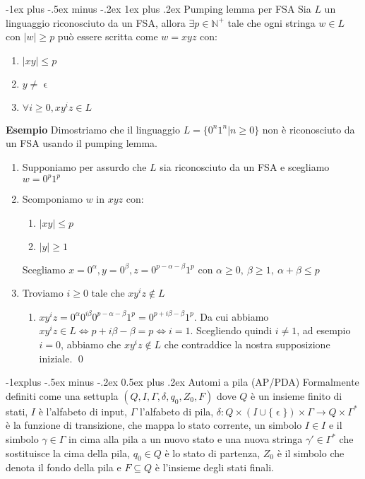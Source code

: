 \documentclass[10pt,landscape]{article}
\makeatletter
\renewcommand{\subsection}{\@startsection{subsection}{2}{0mm}%
                                {-1explus -.5ex minus -.2ex}%
                                {0.5ex plus .2ex}%
                                {\normalfont\large\bfseries}}
\renewcommand{\subsubsection}{\@startsection{subsubsection}{3}{0mm}%
                                {-1ex plus -.5ex minus -.2ex}%
                                {1ex plus .2ex}%
                                {\normalfont\normalsize\bfseries}}
\makeatother
\begin{document}
\begin{multicols*}{4}
        \subsubsection{Pumping lemma per FSA}
        Sia $L$ un linguaggio riconosciuto da un FSA, allora $\exists p \in \mathbb{N}^+$ tale che ogni stringa $w \in L$ con $|w| \geq p$ può essere scritta come $w = xyz$ con:
        \begin{enumerate}[left=3pt, itemsep=-1pt]
                \item $|xy| \leq p$
                \item $y \neq \upvarepsilon$
                \item $\forall i \geq 0, xy^iz \in L$
        \end{enumerate}
        \textbf{Esempio} Dimostriamo che il linguaggio $L = \{0^n1^n | n \geq 0\}$ non è riconosciuto da un FSA usando il pumping lemma.
        \begin{enumerate}[left=3pt, itemsep=0pt]
                \item Supponiamo per assurdo che $L$ sia riconosciuto da un FSA e scegliamo $w = 0^p1^p$
                \item Scomponiamo $w$ in $xyz$ con:
                      \begin{enumerate}[left=0pt, topsep=0pt, label=\tiny\textbullet]
                              \item $|xy| \leq p$
                              \item $|y| \geq 1$
                      \end{enumerate}
                      Scegliamo $x=0^\alpha, y=0^\beta, z=0^{p-\alpha-\beta}1^p$ con $\alpha \geq 0,\ \beta \geq 1,\ \alpha + \beta \leq p$
                \item Troviamo $i \geq 0$ tale che $xy^iz \notin L$
                      \begin{enumerate}[left=-3pt, topsep=0pt, label=]
                              \item $xy^iz = 0^\alpha0^{i\beta}0^{p-\alpha-\beta}1^p = 0^{p+i\beta-\beta}1^p$. Da cui abbiamo $xy^iz \in L \iff p+i\beta-\beta = p \iff i = 1$. Scegliendo quindi $i \neq 1$, ad esempio $i = 0$, abbiamo che $xy^iz \notin L$ che contraddice la nostra supposizione iniziale. \qed
                      \end{enumerate}
        \end{enumerate}
        \subsection{Automi a pila (AP/PDA)}
        Formalmente definiti come una settupla $(Q,I,\Gamma,\delta,q_0,Z_0,F)$ dove $Q$ è un insieme finito di stati, $I$ è l'alfabeto di input, $\Gamma$  l'alfabeto di pila, $\delta : Q \times (I \cup \{\upvarepsilon\}) \times \Gamma \rightarrow Q \times \Gamma^*$ è la funzione di transizione, che mappa lo stato corrente, un simbolo $I \in I$ e il simbolo $\gamma \in \Gamma$ in cima alla pila a un nuovo stato e una nuova stringa $\gamma' \in \Gamma^*$ che sostituisce la cima della pila, $q_0 \in Q$ è lo stato di partenza, $Z_0$ è il simbolo che denota il fondo della pila e $F \subseteq Q$ è l'insieme degli stati finali.

\end{multicols*}
\end{document}
